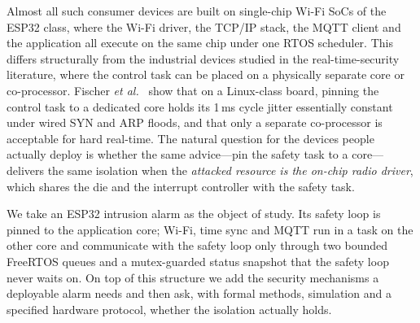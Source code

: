Almost all such consumer devices are built on single-chip Wi-Fi SoCs of the ESP32 class, where
the Wi-Fi driver, the TCP/IP stack, the MQTT client and the application all execute on the same
chip under one RTOS scheduler. This differs structurally from the industrial devices studied in
the real-time-security literature, where the control task can be placed on a physically separate
core or co-processor. Fischer \emph{et al.}~\cite{fischer2020} show that on a Linux-class board,
pinning the control task to a dedicated core holds its 1\,ms cycle jitter essentially constant
under wired SYN and ARP floods, and that only a separate co-processor is acceptable for hard
real-time. The natural question for the devices people actually deploy is whether the same
advice---pin the safety task to a core---delivers the same isolation when the \emph{attacked
resource is the on-chip radio driver}, which shares the die and the interrupt controller with
the safety task.

We take an ESP32 intrusion alarm as the object of study. Its safety loop is pinned to the
application core; Wi-Fi, time sync and MQTT run in a task on the other core and communicate with
the safety loop only through two bounded FreeRTOS queues and a mutex-guarded status snapshot
that the safety loop never waits on. On top of this structure we add the security mechanisms a
deployable alarm needs and then ask, with formal methods, simulation and a specified hardware
protocol, whether the isolation actually holds.


